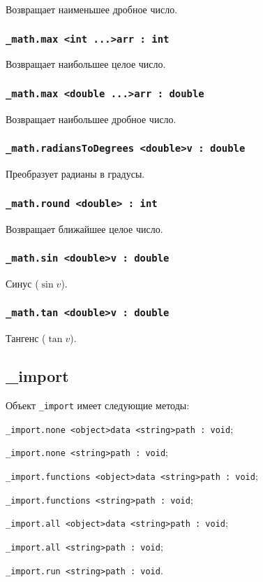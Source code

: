 Возвращает наименьшее дробное число.

\subsubsection{\lstinline|_math.max <int ...>arr : int|}

Возвращает наибольшее целое число.

\subsubsection{\lstinline|_math.max <double ...>arr : double|}

Возвращает наибольшее дробное число.

\subsubsection{\lstinline|_math.radiansToDegrees <double>v : double|}

Преобразует радианы в градусы.

\subsubsection{\lstinline|_math.round <double> : int|}

Возвращает ближайшее целое число.

\subsubsection{\lstinline|_math.sin <double>v : double|}

Синус ($\sin{v}$).

\subsubsection{\lstinline|_math.tan <double>v : double|}

Тангенс ($\tan{v}$).

\subsection{{\color{orange} \_import}}

Объект \lstinline|_import| имеет следующие методы:
\begin{icItems}
	\item \lstinline|_import.none <object>data <string>path : void|;
	\item \lstinline|_import.none <string>path : void|;
	\item \lstinline|_import.functions <object>data <string>path : void|;
	\item \lstinline|_import.functions <string>path : void|;
	\item \lstinline|_import.all <object>data <string>path : void|;
	\item \lstinline|_import.all <string>path : void|;
	\item \lstinline|_import.run <string>path : void|.
\end{icItems}

